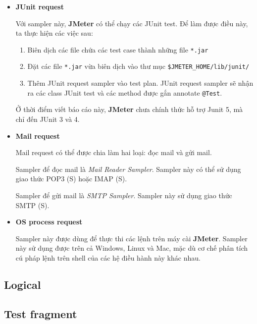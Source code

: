 \documentclass[10pt]{report}
\newcommand{\jmeter}{\textbf{JMeter}}
\newcommand{\jmeterhome}{\texttt{\$JMETER\_HOME}}
\begin{document}
\begin{itemize}[itemsep=0pt]
        \begin{quotation}
            \texttt{org.apache.jmeter.protocol.java.sampler.JavaSamplerClient}
        \end{quotation}
    \item \textbf{JUnit request}
        \par Với sampler này, \jmeter{} có thể chạy các JUnit test. Để làm được điều này, ta thực hiện các việc sau:
        \begin{enumerate}[itemsep=0pt,itemindent=1cm,label = Bước \arabic*.]
            \item Biên dịch các file chứa các test case thành những file \texttt{*.jar}
            \item Đặt các file \texttt{*.jar} vừa biên dịch vào thư mục \texttt{\jmeterhome{}/lib/junit/}
            \item Thêm JUnit request sampler vào test plan. JUnit request sampler sẽ nhận ra các class JUnit test và các method được gắn annotate \texttt{@Test}.
        \end{enumerate}
        \par Ở thời điểm viết báo cáo này, \jmeter{} chưa chính thức hỗ trợ Junit 5, mà chỉ đến JUnit 3 và 4.
    \item \textbf{Mail request}
        \par Mail request có thể được chia làm hai loại: đọc mail và gửi mail.
        \par Sampler để đọc mail là \textit{Mail Reader Sampler}. Sampler này có thể sử dụng giao thức POP3 (S) hoặc IMAP (S).
        \par Sampler để gửi mail là \textit{SMTP Sampler}. Sampler này sử dụng giao thức SMTP (S).
    \item \textbf{OS process request}
        \par Sampler này được dùng để thực thi các lệnh trên máy cài \jmeter{}. Sampler này sử dụng được trên cả Windows, Linux và Mac, mặc dù cơ chế phân tích cú pháp lệnh trên shell của các hệ điều hành này khác nhau.
\end{itemize}

\subsection{Logical}

\subsection{Test fragment}
\end{document}
